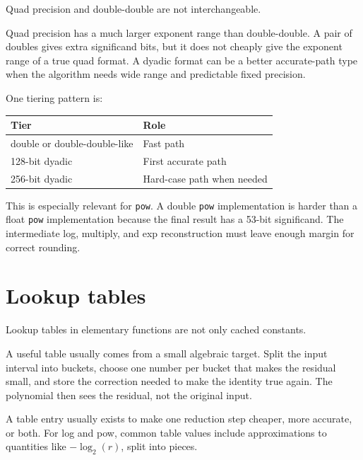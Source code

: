 \documentclass[manuscript, nonacm]{acmart}
\begin{document}
    Quad precision and double-double are not interchangeable.

    Quad precision has a much larger exponent range than double-double. A pair
    of doubles gives extra significand bits, but it does not cheaply give the
    exponent range of a true quad format. A dyadic format can be a better
    accurate-path type when the algorithm needs wide range and predictable fixed
    precision.

    One tiering pattern is:

    \begin{table}[tbp]
        \centering
        \begin{tabular}{ll}
            \toprule
            Tier                         & Role                       \\
            \midrule
            double or double-double-like & Fast path                  \\
            128-bit dyadic               & First accurate path        \\
            256-bit dyadic               & Hard-case path when needed \\
            \bottomrule
        \end{tabular}
    \end{table}

    This is especially relevant for \texttt{pow}. A double \texttt{pow}
    implementation is harder than a float \texttt{pow} implementation because the
    final result has a 53-bit significand. The intermediate log, multiply, and
    exp reconstruction must leave enough margin for correct rounding.



    \section{Lookup tables}

    Lookup tables in elementary functions are not only cached constants.

    A useful table usually comes from a small algebraic target. Split the input
    interval into buckets, choose one number per bucket that makes the residual
    small, and store the correction needed to make the identity true again. The
    polynomial then sees the residual, not the original input.

    A table entry usually exists to make one reduction step cheaper, more
    accurate, or both. For log and pow, common table values include
    approximations to quantities like $-\log_2(r)$, split into pieces.
\end{document}
